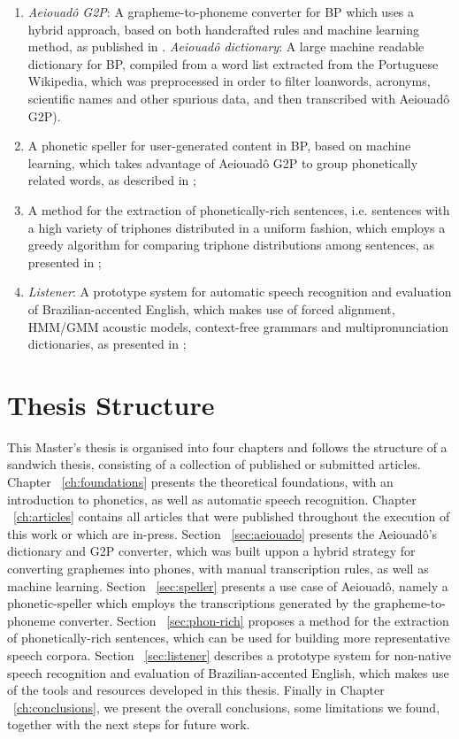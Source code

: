 \begin{enumerate}
 \item \emph{Aeiouad\^o G2P}: A grapheme-to-phoneme converter for \ac{BP} which uses a hybrid approach, based on both handcrafted rules and machine learning method, as published in \citeauthor{Mendonca2014} \cite{Mendonca2014}. \emph{Aeiouad\^o dictionary}: A large machine readable dictionary for \ac{BP}, compiled from a word list extracted from the Portuguese Wikipedia, which was preprocessed in order to filter loanwords, acronyms, scientific names and other spurious data, and then transcribed with Aeiouad\^o G2P).
 \item A phonetic speller for user-generated content in \ac{BP}, based on machine learning, which takes advantage of Aeiouad\^o G2P to group phonetically related words, as described in \citeauthor{Mendonca2015} \cite{Mendonca2015}; 
 \item A method for the extraction of phonetically-rich sentences, i.e. sentences with a high variety of triphones distributed in a uniform fashion, which employs a greedy algorithm for comparing triphone distributions among sentences, as presented in \citeauthor{Mendonca2014b} \cite{Mendonca2014b};
 \item \emph{Listener}: A prototype system for automatic speech recognition and evaluation of Brazilian-accented English, which makes use of forced alignment, \ac{HMM}/\ac{GMM} acoustic models, context-free grammars and multipronunciation dictionaries, as presented in \citeauthor{Mendonca2016} \cite{Mendonca2016};
\end{enumerate}

\section*{Thesis Structure}

This Master's thesis is organised into four chapters and follows the structure of a sandwich thesis, consisting of a collection of published or submitted articles. Chapter ~\ref{ch:foundations} presents the theoretical foundations, with an introduction to phonetics, as well as automatic speech recognition. Chapter ~\ref{ch:articles} contains all articles that were published throughout the execution of this work or which are in-press. Section ~\ref{sec:aeiouado} presents the Aeiouad\^o's dictionary and \ac{G2P} converter, which was built uppon a hybrid strategy for converting graphemes into phones, with manual transcription rules, as well as machine learning. Section ~\ref{sec:speller} presents a use case of Aeiouad\^o, namely a phonetic-speller which employs the transcriptions generated by the grapheme-to-phoneme converter. Section ~\ref{sec:phon-rich} proposes a method for the extraction of phonetically-rich sentences, which can be used for building more representative speech corpora. Section ~\ref{sec:listener} describes a prototype system for non-native speech recognition and evaluation of Brazilian-accented English, which makes use of the tools and resources developed in this thesis. Finally in Chapter ~\ref{ch:conclusions}, we present the overall conclusions, some limitations we found, together with the next steps for future work.